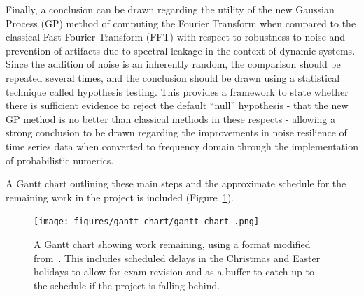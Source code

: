 \documentclass[12pt]{article}
\begin{document}
    Finally, a conclusion can be drawn regarding the utility of the new Gaussian Process (GP) method of computing the Fourier Transform when compared to the classical Fast Fourier Transform (FFT) with respect to robustness to noise and prevention of artifacts due to spectral leakage in the context of dynamic systems.
    Since the addition of noise is an inherently random, the comparison should be repeated several times, and the conclusion should be drawn using a statistical technique called hypothesis testing.
    This provides a framework to state whether there is sufficient evidence to reject the default ``null'' hypothesis - that the new GP method is no better than classical methods in these respects - allowing a strong conclusion to be drawn regarding the improvements in noise resilience of time series data when converted to frequency domain through the implementation of probabilistic numerics.

    A Gantt chart outlining these main steps and the approximate schedule for the remaining work in the project is included (Figure~\ref{fig:gantt-chart_}).

    \begin{landscape}
        \begin{figure}[p] %
            \centering
            \texttt{[image: figures/gantt\_chart/gantt-chart\_.png]}
            \caption{A Gantt chart showing work remaining, using a format modified from~\cite{DataCampGanttChart2021}. This includes scheduled delays in the Christmas and Easter holidays to allow for exam revision and as a buffer to catch up to the schedule if the project is falling behind.}
            \label{fig:gantt-chart_}
        \end{figure}
    \end{landscape}

    \FloatBarrier





    \newpage
    \printbibliography
    \newpage
    
\end{document}

